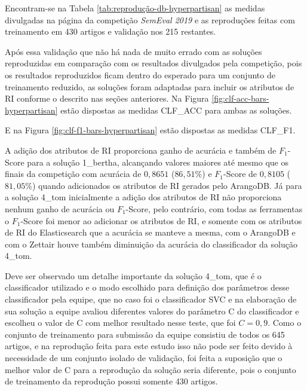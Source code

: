 			Encontram-se na Tabela \ref{tab:reprodução-db-hyperpartisan} as medidas divulgadas na página da competição \textit{SemEval 2019} \cite{PAN_HNDLEADERBOARD_2019} e as reproduções feitas com treinamento em 430 artigos e validação nos 215 restantes.

			

			Após essa validação que não há nada de muito errado com as soluções reproduzidas em comparação com os resultados divulgados pela competição, pois os resultados reproduzidos ficam dentro do esperado para um conjunto de treinamento reduzido, as soluções foram adaptadas para incluir os atributos de RI conforme o descrito nas seções anteriores.
			Na Figura \ref{fig:clf-acc-bars-hyperpartisan} estão dispostas as medidas CLF\_ACC para ambas as soluções.
			
			

			E na Figura \ref{fig:clf-f1-bars-hyperpartisan} estão dispostas as medidas CLF\_F1.
			
			

			A adição dos atributos de RI proporciona ganho de acurácia e também de $F_1$-Score para a solução 1\_bertha, alcançando valores maiores até mesmo que os finais da competição com acurácia de $0,8651$ ($86,51\%$) e $F_1$-Score de $0,8105$ ($81,05\%$) quando adicionados os atributos de RI gerados pelo ArangoDB.
			Já para a solução 4\_tom inicialmente a adição dos atributos de RI não proporciona nenhum ganho de acurácia ou $F_1$-Score, pelo contrário, com todas as ferramentas o $F_1$-Score foi menor ao adicionar os atributos de RI, e somente com os atributos de RI do Elasticsearch que a acurácia se manteve a mesma, com o ArangoDB e com o Zettair houve também diminuição da acurácia do classificador da solução 4\_tom.

			Deve ser observado um detalhe importante da solução 4\_tom, que é o classificador utilizado e o modo escolhido para definição dos parâmetros desse classificador pela equipe, que no caso foi o classificador SVC e na elaboração de sua solução a equipe avaliou diferentes valores do parâmetro C do classificador e escolheu o valor de C com melhor resultado nesse teste, que foi $C = 0,9$.
			Como o conjunto de treinamento para submissão da equipe consistiu de todos os 645 artigos, e na reprodução feita para este estudo isso não pode ser feito devido à necessidade de um conjunto isolado de validação, foi feita a suposição que o melhor valor de C para a reprodução da solução seria diferente, pois o conjunto de treinamento da reprodução possui somente 430 artigos.
			
